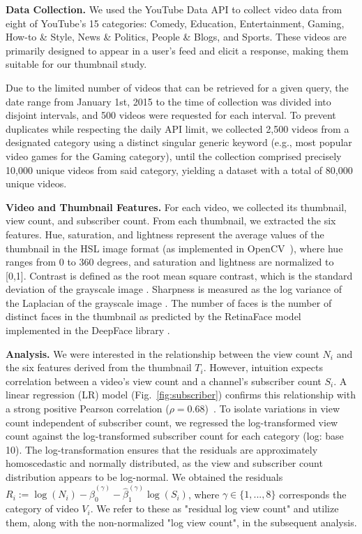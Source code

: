 \documentclass{article}
\begin{document}
\textbf{Data Collection.} We used the YouTube Data API \cite{youtubeapi} to collect video data from eight of YouTube's 15 categories: Comedy, Education, Entertainment, Gaming, How-to \& Style, News \& Politics, People \& Blogs, and Sports. These videos are primarily designed to appear in a user's feed and elicit a response, making them suitable for our thumbnail study.

Due to the limited number of videos that can be retrieved for a given query, the date range from January 1st, 2015 to the time of collection was divided into disjoint intervals, and 500 videos were requested for each interval. To prevent duplicates while respecting the daily API limit, we collected 2,500 videos from a designated category using a distinct singular generic keyword (e.g., most popular video games for the Gaming category), until the collection comprised precisely 10,000 unique videos from said category, yielding a dataset with a total of 80,000 unique videos.

\textbf{Video and Thumbnail Features.} For each video, we collected its thumbnail, view count, and subscriber count. From each thumbnail, we extracted the six features. Hue, saturation, and lightness represent the average values of the thumbnail in the HSL image format \cite{HSL} (as implemented in OpenCV~\cite{opencv_library}), where hue ranges from 0 to 360 degrees, and saturation and lightness are normalized to [0,1]. Contrast is defined as the root mean square contrast, which is the standard deviation of the grayscale image \cite{contrast}. Sharpness is measured as the log variance of the Laplacian of the grayscale image \cite{sharpness}. The number of faces is the number of distinct faces in the thumbnail as predicted by the RetinaFace model implemented in the DeepFace library \cite{serengil2024lightface,serengil2020lightface}.

\textbf{Analysis.} We were interested in the relationship between the view count $N_i$ and the six features derived from the thumbnail $T_i$. However, intuition expects correlation between a video's view count and a channel's subscriber count $S_i$. A linear regression (LR) model (Fig.~\ref{fig:subscriber}) confirms this relationship with a strong positive Pearson correlation ($\rho=0.68$)~\cite{seabold2010statsmodels}. 
To isolate variations in view count independent of subscriber count, we regressed the log-transformed view count against the log-transformed subscriber count for each category (log: base 10). The log-transformation ensures that the residuals are approximately homoscedastic and normally distributed, as the view and subscriber count distribution appears to be log-normal. We obtained the residuals $R_{i} := \log(N_i) - \hat{\beta}_0^{(\gamma)} - \hat{\beta}_1^{(\gamma)} \log(S_i)$, where $\gamma \in \{1,..., 8\}$ corresponds the category of video $V_i$. We refer to these as "residual log view count" and utilize them, along with the non-normalized "log view count", in the subsequent analysis.
\end{document}

